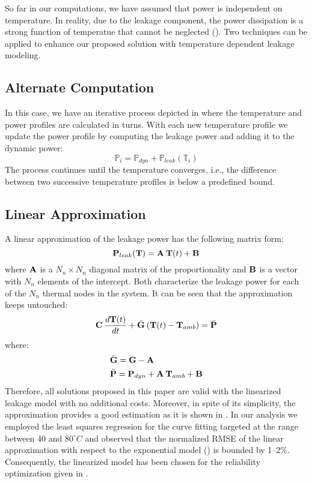 So far in our computations, we have assumed that power is independent on temperature. In reality, due to the leakage component, the power dissipation is a strong function of temperatue that cannot be neglected (). Two techniques can be applied to enhance our proposed solution with temperature dependent leakage modeling.

\subsection{Alternate Computation}
In this case, we have an iterative process depicted in  where the temperature and power profiles are calculated in turns. With each new temperature profile we update the power profile by computing the leakage power and adding it to the dynamic power:
\[
  \mathbb{P}_i = \mathbb{P}_{dyn} + \mathbb{P}_{leak}(\mathbb{T}_i)
\]
The process continues until the temperature converges, i.e., the difference between two successive temperature profiles is below a predefined bound.

\subsection{Linear Approximation}
A linear approximation of the leakage power has the following matrix form:
\[
  \mathbf{P}_{leak}(\mathbf{T}) = \mathbf{A} \: \mathbf{T}(t) + \mathbf{B}
\]
where $\mathbf{A}$ is a $N_n \times N_n$ diagonal matrix of the proportionality and $\mathbf{B}$ is a vector with $N_n$ elements of the intercept. Both characterize the leakage power for each of the $N_n$ thermal nodes in the system. It can be seen that the approximation keeps  untouched:
\[
  \mathbf{C} \: \frac{d\mathbf{T}(t)}{dt} + \bar{\mathbf{G}} \: (\mathbf{T}(t) - \mathbf{T}_{amb}) = \bar{\mathbf{P}}
\]
where:
\begin{align*}
  & \bar{\mathbf{G}} = \mathbf{G} - \mathbf{A} \\
  & \bar{\mathbf{P}} = \mathbf{P}_{dyn} + \mathbf{A} \: \mathbf{T}_{amb} + \mathbf{B}
\end{align*}
Therefore, all solutions proposed in this paper are valid with the linearized leakage model with no additional costs. Moreover, in spite of its simplicity, the approximation provides a good estimation as it is shown in \cite{liu2007}. In our analysis we employed the least squares regression \cite{press2007} for the curve fitting targeted at the range between 40 and $80^\circ C$ and observed that the normalized RMSE of the linear approximation with respect to the exponential model () is bounded by 1--2\%. Consequently, the linearized model has been chosen for the reliability optimization given in .
